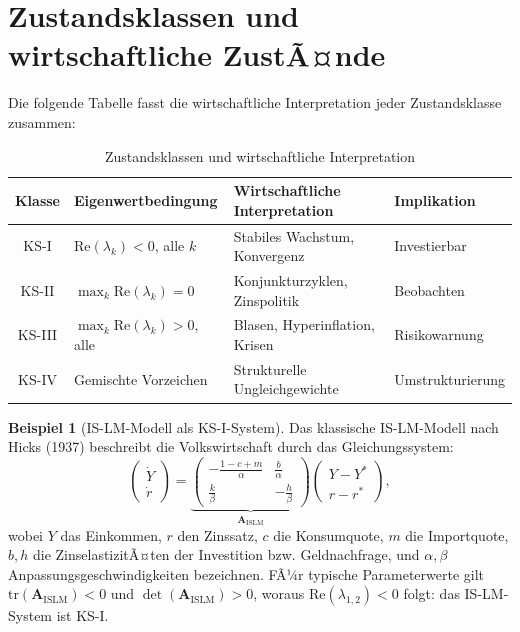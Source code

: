 ﻿\documentclass[12pt, a4paper, titlepage]{report}
\theoremstyle{definition}
\newtheorem{example}[theorem]{Beispiel}
\theoremstyle{remark}
\newcommand{\vA}{\bm{A}}
\newcommand{\tr}{\mathrm{tr}}
\newcommand{\re}{\mathrm{Re}}
\begin{document}
\section{Zustandsklassen und wirtschaftliche ZustÃ¤nde}

Die folgende Tabelle fasst die wirtschaftliche Interpretation jeder Zustandsklasse
zusammen:

\begin{table}[H]
\centering
\caption{Zustandsklassen und wirtschaftliche Interpretation}
\label{tab:klassen_wirtschaft}
\begin{tabular}{clll}
\toprule
Klasse & Eigenwertbedingung & Wirtschaftliche Interpretation & Implikation \\
\midrule
KS-I   & $\re(\lambda_k) < 0$, alle $k$
        & Stabiles Wachstum, Konvergenz & Investierbar \\
KS-II  & $\max_k\re(\lambda_k) = 0$
        & Konjunkturzyklen, Zinspolitik & Beobachten \\
KS-III & $\max_k\re(\lambda_k) > 0$, alle
        & Blasen, Hyperinflation, Krisen & Risikowarnung \\
KS-IV  & Gemischte Vorzeichen
        & Strukturelle Ungleichgewichte & Umstrukturierung \\
\bottomrule
\end{tabular}
\end{table}

\begin{example}[IS-LM-Modell als KS-I-System]
Das klassische IS-LM-Modell nach Hicks (1937) beschreibt die Volkswirtschaft durch
das Gleichungssystem:
\begin{equation}
  \begin{pmatrix} \dot{Y} \\ \dot{r} \end{pmatrix} =
  \underbrace{\begin{pmatrix} -\frac{1-c+m}{\alpha} & \frac{b}{\alpha} \\
    \frac{k}{\beta} & -\frac{h}{\beta} \end{pmatrix}}_{\vA_{\mathrm{ISLM}}}
  \begin{pmatrix} Y - Y^* \\ r - r^* \end{pmatrix},
  \label{eq:islm}
\end{equation}
wobei $Y$ das Einkommen, $r$ den Zinssatz, $c$ die Konsumquote, $m$ die Importquote,
$b, h$ die ZinselastizitÃ¤ten der Investition bzw. Geldnachfrage, und $\alpha, \beta$
Anpassungsgeschwindigkeiten bezeichnen. FÃ¼r typische Parameterwerte gilt
$\tr(\vA_{\mathrm{ISLM}}) < 0$ und $\det(\vA_{\mathrm{ISLM}}) > 0$, woraus
$\re(\lambda_{1,2}) < 0$ folgt: das IS-LM-System ist KS-I.
\end{example}
\end{document}

